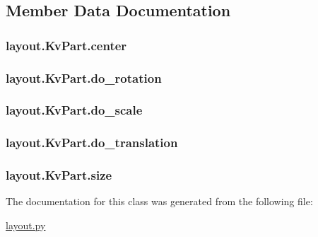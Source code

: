 \subsection{Member Data Documentation}
\hypertarget{classlayout_1_1_kv_part_a9312cd8095be3ad77b82abf86df37067}{}
\subsubsection[{center}]{\setlength{\rightskip}{0pt plus 5cm}layout.\+Kv\+Part.\+center}\label{classlayout_1_1_kv_part_a9312cd8095be3ad77b82abf86df37067}
\hypertarget{classlayout_1_1_kv_part_a1739f4ee84babf0064e76863c5656db3}{}
\subsubsection[{do\+\_\+rotation}]{\setlength{\rightskip}{0pt plus 5cm}layout.\+Kv\+Part.\+do\+\_\+rotation}\label{classlayout_1_1_kv_part_a1739f4ee84babf0064e76863c5656db3}
\hypertarget{classlayout_1_1_kv_part_a4fc185fde93f1abf7b5a5af29f700c14}{}
\subsubsection[{do\+\_\+scale}]{\setlength{\rightskip}{0pt plus 5cm}layout.\+Kv\+Part.\+do\+\_\+scale}\label{classlayout_1_1_kv_part_a4fc185fde93f1abf7b5a5af29f700c14}
\hypertarget{classlayout_1_1_kv_part_a23cd17027451dd736536090dfbc96f13}{}
\subsubsection[{do\+\_\+translation}]{\setlength{\rightskip}{0pt plus 5cm}layout.\+Kv\+Part.\+do\+\_\+translation}\label{classlayout_1_1_kv_part_a23cd17027451dd736536090dfbc96f13}
\hypertarget{classlayout_1_1_kv_part_aed82f67195a9613bc3dc65d5e3848631}{}
\subsubsection[{size}]{\setlength{\rightskip}{0pt plus 5cm}layout.\+Kv\+Part.\+size}\label{classlayout_1_1_kv_part_aed82f67195a9613bc3dc65d5e3848631}


The documentation for this class was generated from the following file\+:\begin{DoxyCompactItemize}
\item 
\hyperlink{layout_8py}{layout.\+py}\end{DoxyCompactItemize}
